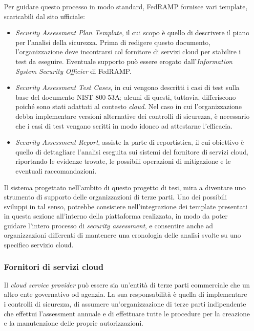 \documentclass[../main.tex]{subfiles}
\begin{document}
Per guidare questo processo in modo standard, FedRAMP fornisce vari template, scaricabili dal sito ufficiale:
\begin{itemize}
    \item \textit{Security Assessment Plan Template}, il cui scopo è quello di descrivere il piano per l'analisi della sicurezza. Prima di redigere questo documento, l'organizzazione deve incontrarsi col fornitore di servizi cloud per stabilire i test da eseguire. Eventuale supporto può essere erogato dall'\textit{Information System Security Officier} di FedRAMP.
    \item \textit{Security Assessment Test Cases}, in cui vengono descritti i casi di test sulla base del documento NIST 800-53A; alcuni di questi, tuttavia, differiscono poiché sono stati adattati al contesto \textit{cloud}. Nel caso in cui l'organizzazione debba implementare versioni alternative dei controlli di sicurezza, è necessario che i casi di test vengano scritti in modo idoneo ad attestarne l'efficacia.
    \item \textit{Security Assessment Report}, assiste la parte di reportistica, il cui obiettivo è quello di dettagliare l'analisi eseguita sui sistemi del fornitore di servizi cloud, riportando le evidenze trovate, le possibili operazioni di mitigazione e le eventuali raccomandazioni.
\end{itemize}

Il sistema progettato nell'ambito di questo progetto di tesi, mira a diventare uno strumento di supporto delle organizzazioni di terze parti.
Uno dei possibili sviluppi in tal senso, potrebbe consistere nell'integrazione dei template presentati in questa sezione all'interno della piattaforma realizzata, in modo da poter guidare l'intero processo di \textit{security assessment}, e consentire anche ad organizzazioni differenti di mantenere una cronologia delle analisi svolte su uno specifico servizio cloud. 

\subsubsection{Fornitori di servizi cloud}
Il \textit{cloud service provider} può essere sia un'entità di terze parti commerciale che un altro ente governativo od agenzia. La sua responsabilità è quella di implementare i controlli di sicurezza, di assumere un'organizzazione di terze parti indipendente che effettui l'assessment annuale e di effettuare tutte le procedure per la creazione e la manutenzione delle proprie autorizzazioni.
\end{document}
